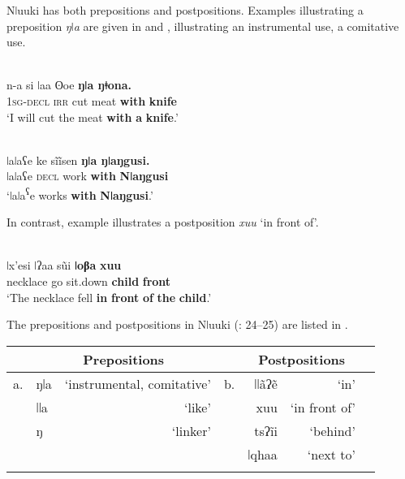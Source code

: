 \documentclass[output=paper]{langsci/langscibook}
\begin{document}
Nǀuuki has both prepositions and postpositions. Examples illustrating a preposition \textit{ŋǀa} are given in  and ,  illustrating an instrumental use,  a comitative use.

\ea\label{ex:dryer:}
\\
\gll n-a  si  ǀaa  ʘoe  \textbf{ŋǀa  ŋǂona.}\\
       \textsc{1sg-decl}  \textsc{irr}  cut  meat  \textbf{with}  \textbf{knife}  \\
\glt ‘I will cut the meat \textbf{with} \textbf{a} \textbf{knife}.’  
\z

\ea\label{ex:dryer:}
\\
\gll ǀaǀaʕe  ke  sĩĩsen  \textbf{ŋǀa  ŋǀaŋgusi.}\\
       ǀaǀaʕe  \textsc{decl}  work  \textbf{with}  \textbf{Nǀaŋgusi}  \\
\glt ‘ǀaǀa\textsuperscript{ʕ}e works \textbf{with} \textbf{Nǀaŋgusi}.’  
\z

In contrast, example  illustrates a postposition \textit{xuu} ‘in front of’.

\ea\label{ex:dryer:}
\\
\gll ǀx’esi  ǀʔaa  s\~ui  \textbf{ǀoβa}  \textbf{xuu}\\
       necklace  go  sit.down  \textbf{child}  \textbf{front}  \\
\glt ‘The necklace fell \textbf{in} \textbf{front} \textbf{of} \textbf{the} \textbf{child}.’ 
\z

The prepositions and postpositions in Nǀuuki (\citealt{CollinsNamaseb2011}: 24–25) are listed in .


\begin{table}
\begin{tabularx}{\textwidth}{Xlrrrrr} 
\lsptoprule
 & \multicolumn{2}{c}{\bfseries Prepositions} &  & \multicolumn{2}{c}{\bfseries Postpositions}\\
\midrule
a. & ŋǀa & ‘instrumental, comitative’ & b. & ǀǀãʔẽ & ‘in’\\
 & ǀǀa & ‘like’ &  & xuu & ‘in front of’\\
 & ŋ & ‘linker’ &  & tsʔĩi & ‘behind’\\
 &  &  &  & ǀqhaa & ‘next to’\\
\lspbottomrule
\end{tabularx}
\end{table}
\end{document}
